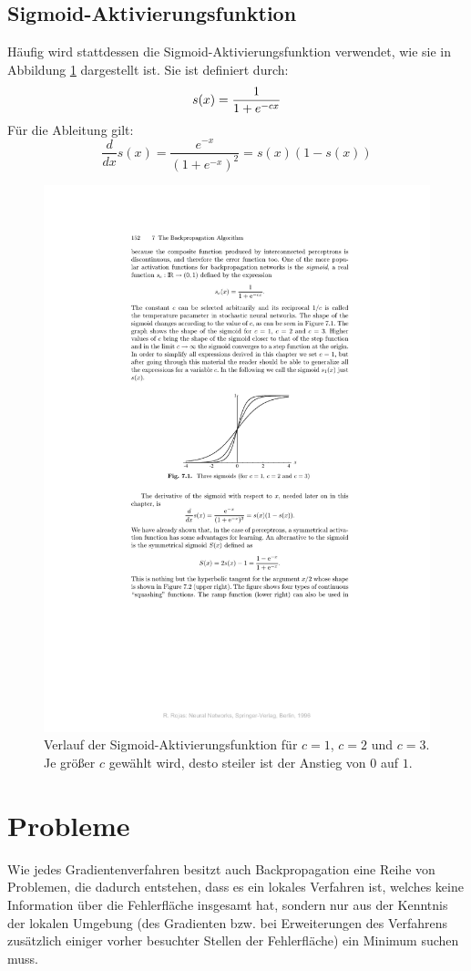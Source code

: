 \subsection*{Sigmoid-Aktivierungsfunktion}
Häufig wird stattdessen die Sigmoid-Aktivierungsfunktion verwendet, wie sie in Abbildung \ref{fig:ch03_sigmoid} dargestellt ist. Sie ist definiert durch:
\[
	s(x) = \frac{1}{1 + e^{-cx}} \\
\]
Für die Ableitung gilt:
\[
	\frac{d}{dx} s(x) = \frac{e^{-x}}{(1 + e^{-x})^2} = s(x)(1-s(x))
\]

\begin{figure}[ht!] \centering 
	\includegraphics[width=0.7\linewidth]{figures/ch03_sigmoid.pdf}
	\caption{Verlauf der Sigmoid-Aktivierungsfunktion für $c=1$, $c=2$ und $c=3$. Je größer $c$ gewählt wird, desto steiler ist der Anstieg von $0$ auf $1$.}
	\label{fig:ch03_sigmoid}
\end{figure}



\section*{Probleme}
Wie jedes Gradientenverfahren besitzt auch Backpropagation eine Reihe von Problemen, die dadurch entstehen, dass es ein lokales Verfahren ist, welches keine Information über die Fehlerfläche insgesamt hat, sondern nur aus der Kenntnis der lokalen Umgebung (des Gradienten bzw. bei Erweiterungen des Verfahrens zusätzlich einiger vorher besuchter Stellen der Fehlerfläche) ein Minimum suchen muss.

